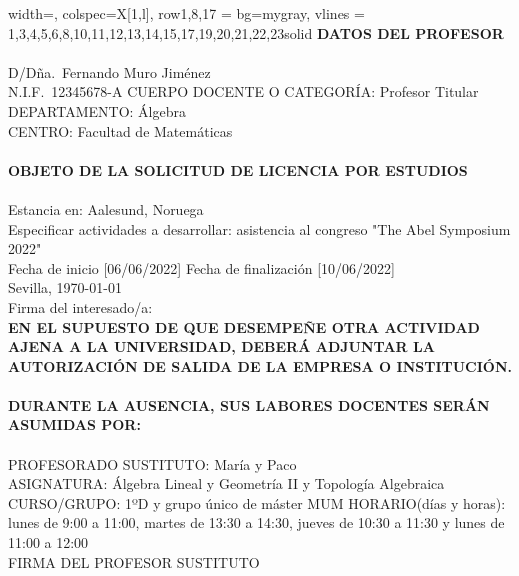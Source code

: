 \documentclass[a4paper,10pt]{article}
\begin{document}
\begin{minipage}{0.7\textwidth}
\begin{longtblr}{width=\textwidth, colspec={X[1,l]}, row{1,8,17} = {bg=mygray}, vlines =
{1,3,4,5,6,8,10,11,12,13,14,15,17,19,20,21,22,23}{solid}}
\hline
\textbf{DATOS DEL PROFESOR} \\
\hline
{} \\[-5mm]
\hline
\small D/Dña.~Fernando Muro Jiménez \\
\small N.I.F.~12345678-A CUERPO DOCENTE O CATEGORÍA: Profesor Titular \\
\small DEPARTAMENTO: Álgebra \\
\small CENTRO: Facultad de Matemáticas \\
\hline
{} \\[-5mm]
\hline
\textbf{OBJETO DE LA SOLICITUD DE LICENCIA POR ESTUDIOS} \\
\hline
{} \\[-5mm]
\hline
Estancia en: Aalesund, Noruega \\
Especificar actividades a desarrollar: asistencia al congreso "The Abel Symposium 2022" \\
Fecha de inicio [06/06/2022] Fecha de finalización [10/06/2022] \\
\centering Sevilla, \today \\[-2mm]
\centering Firma del interesado/a: \\[10mm]
\textbf{EN EL SUPUESTO DE QUE DESEMPEÑE OTRA ACTIVIDAD AJENA A LA UNIVERSIDAD, DEBERÁ ADJUNTAR LA AUTORIZACIÓN DE SALIDA
DE LA EMPRESA O INSTITUCIÓN.} \\
\hline
{} \\[-5mm]
\hline
\textbf{DURANTE LA AUSENCIA, SUS LABORES DOCENTES SERÁN ASUMIDAS POR:} \\
\hline
{} \\[-5mm]
\hline
\small PROFESORADO SUSTITUTO: María y Paco\\
\small ASIGNATURA: Álgebra Lineal y Geometría II y Topología Algebraica\\
\small CURSO/GRUPO: 1ºD y grupo único de máster MUM HORARIO(días y horas): lunes de 9:00 a 11:00, martes de 13:30 a 14:30, jueves de 10:30 a 11:30 y lunes de 11:00 a 12:00\\
\centering\small FIRMA DEL PROFESOR SUSTITUTO \\[10mm]
\hline
\end{longtblr}
\end{minipage}

\vspace{-3mm}
\end{document}
